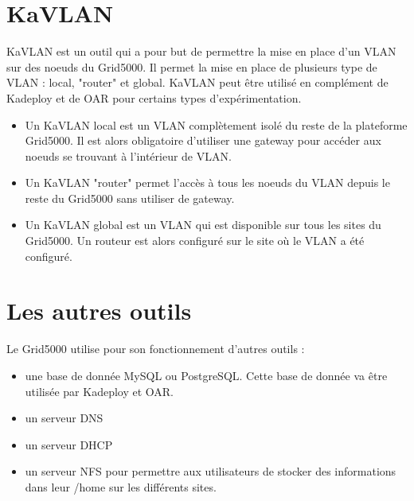 \documentclass [10pt,a4paper]{report}
\begin{document}
		\section{KaVLAN}
			KaVLAN est un outil qui a pour but de permettre la mise en place d'un VLAN sur des noeuds du Grid5000. Il permet la mise en place de plusieurs type de VLAN : local, "router" et global. KaVLAN peut être utilisé en complément de Kadeploy et de OAR pour certains types d'expérimentation.\\
			\begin{itemize}
  				\item Un KaVLAN local est un VLAN complètement isolé du reste de la plateforme Grid5000. Il est alors obligatoire d'utiliser une gateway pour accéder aux noeuds se trouvant à l'intérieur de VLAN.
  				\item Un KaVLAN "router" permet l'accès à tous les noeuds du VLAN depuis le reste du Grid5000 sans utiliser de gateway.
 				 \item Un KaVLAN global est un VLAN qui est disponible sur tous les sites du Grid5000. Un routeur est alors configuré sur le site où le VLAN a été configuré.
			\end{itemize}
			
		\section{Les autres outils}
			Le Grid5000 utilise pour son fonctionnement d'autres outils :
				\begin{itemize}
					\item une base de donnée MySQL ou PostgreSQL. Cette base de donnée va \^etre utilisée par Kadeploy et OAR.
					\item un serveur DNS				
					\item un serveur DHCP
					\item un serveur NFS pour permettre aux utilisateurs de stocker des informations dans leur /home sur les différents sites.
				\end{itemize}
	
\end{document}
